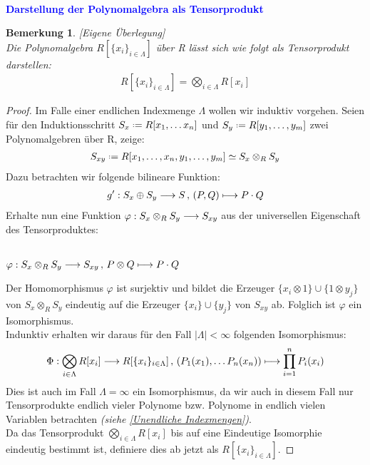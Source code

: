 \documentclass[10pt,a4paper]{report}
\newcounter{Aussage}[chapter]
\newtheorem{bem}[Aussage]{Bemerkung}
\newcommand{\functionfront}[3]{\nolinebreak{#1:#2 \longrightarrow #3}}
\newcommand{\function}[5]{\nolinebreak{#1:#2 \longrightarrow #3 \, , \, #4 \longmapsto #5}}
\newcommand{\Tensor}[3]{#1 \otimes_{#2} #3}
\newcommand{\tensor}[3]{#1 \otimes #3}
\newcommand*{\defeq}{\mathrel{\vcenter{\baselineskip0.5ex \lineskiplimit0pt
                     \hbox{\scriptsize.}\hbox{\scriptsize.}}}%
                     =}
\begin{document}
\ \\
\textcolor{blue}{\textbf{Darstellung der Polynomalgebra als Tensorprodukt}}
\begin{bem}\label{Darstellung der Polynomalgebra als Tensorprodukt}\textit{[Eigene Überlegung]}\\
Die Polynomalgebra $R[\lbrace x_i \rbrace_{i \in \Lambda}]$ über R lässt sich wie folgt als Tensorprodukt darstellen:
\begin{gather*}
R[\lbrace x_i \rbrace_{i \in  \Lambda}] = \bigotimes_{i \in \Lambda} R[x_i]
\end{gather*}
\end{bem}
\begin{proof}
Im Falle einer endlichen Indexmenge $\Lambda$ wollen wir induktiv vorgehen. Seien für den Induktionsschritt $S_x \defeq R[x_1, \dots x_n]$ und $S_y \defeq R[y_1, \dots , y_m]$ zwei Polynomalgebren über R, zeige:
\begin{gather*}
S_{xy} \defeq R[x_1, \dots , x_n, y_1 , \dots , y_m] \simeq \Tensor{S_x}{R}{S_y}
\end{gather*}
Dazu betrachten wir folgende bilineare Funktion:
\begin{gather*}
\function{g'}{S_x \oplus S_y}{S}{(P,Q)}{P \cdot Q}
\end{gather*}
Erhalte nun eine Funktion $\functionfront{\varphi}{\Tensor{S_x}{R}{S_y}}{S_{xy}}$ aus der universellen Eigenschaft des Tensorproduktes:
\begin{center}
\ \\
$\function{\varphi}{\Tensor{S_x}{R}{S_y}}{S_{xy}}{\tensor{P}{R}{Q}}{P \cdot Q}$
\end{center}
Der Homomorphismus $\varphi$ ist surjektiv und bildet die Erzeuger $\lbrace \tensor{x_i}{R}{1} \rbrace \cup \lbrace \tensor{1}{R}{y_j} \rbrace$ von $\Tensor{S_x}{R}{S_y}$ eindeutig auf die Erzeuger $\lbrace x_i \rbrace \cup \lbrace y_j \rbrace$ von $S_{xy}$ ab. Folglich ist $\varphi$ ein Isomorphismus.\\
Indunktiv erhalten wir daraus für den Fall $\vert \Lambda \vert < \infty$ folgenden Isomorphismus:
\begin{gather*}
\function{\Phi}{\bigotimes_{i \in \Lambda} R[x_i]}{R[\lbrace x_i \rbrace_{i \in \Lambda} ]}{(P_1(x_1), \dots P_n(x_n))}{\prod_{i=1}^{n} P_i(x_i)}
\end{gather*}
Dies ist auch im Fall $\Lambda = \infty$ ein Isomorphismus, da wir auch in diesem Fall nur Tensorprodukte endlich vieler Polynome bzw. Polynome in endlich vielen Variablen betrachten \textit{(siehe \cref{Unendliche Indexmengen})}.\\
Da das Tensorprodukt $\bigotimes_{i \in \Lambda} R[x_i]$ bis auf eine Eindeutige Isomorphie eindeutig bestimmt ist, definiere dies ab jetzt als $R[\lbrace x_i \rbrace_{i \in \Lambda}]$.
\end{proof}
\end{document}
